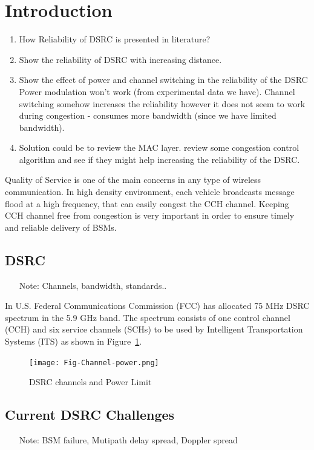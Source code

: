 \documentclass[runningheads,a4paper]{llncs}
\begin{document}
\section{Introduction}
\begin{enumerate}
	\item How Reliability of DSRC is presented in literature?
	\item Show the reliability of DSRC with increasing distance.
	\item Show the effect of power and channel switching in the reliability of the DSRC
		\subitem Power modulation won't work (from experimental data we have). 
		\subitem Channel switching somehow increases the reliability however it does not seem to work during congestion - consumes more bandwidth (since we have limited bandwidth).
	\item Solution could be to review the MAC layer.
		\subitem review some congestion control algorithm and see if they might help increasing the reliability of the DSRC.
	
\end{enumerate}
Quality of Service is one of the main concerns in any type of wireless communication. In high density environment, each vehicle broadcasts message flood at a high frequency, that can easily congest the CCH channel. Keeping CCH channel free from congestion is very important in order to ensure timely and reliable delivery of BSMs.

\subsection{DSRC}

\begin{enumerate}
	\item[Note:] Channels, bandwidth, standards..
\end{enumerate}
In U.S. Federal Communications Commission (FCC) has allocated 75 MHz DSRC spectrum in the 5.9 GHz band. The spectrum consists of one control channel (CCH) and six service channels (SCHs) to be used by Intelligent Transportation Systems (ITS) as shown in Figure~\ref{Fig-Channels}.

\begin{figure}[thpb] 
	\centering
	\texttt{[image: Fig-Channel-power.png]}
	\caption{DSRC channels and Power Limit \cite{IEEE-2003}}
	\label{Fig-Channels}
\end{figure}
\subsection{Current DSRC Challenges}
\begin{enumerate}
	\item[Note:] BSM failure, Mutipath delay spread, Doppler spread
\end{enumerate}
\end{document}
